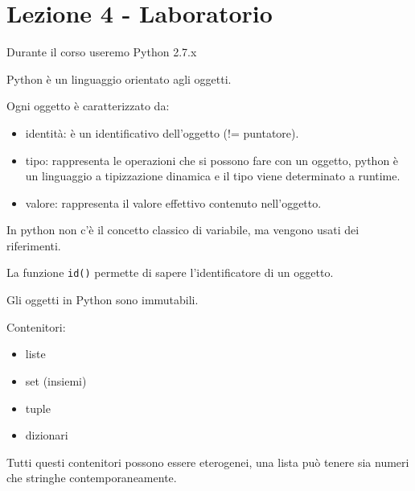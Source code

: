 \section{Lezione 4 - Laboratorio}\label{lezione-4---laboratorio}

Durante il corso useremo Python 2.7.x

Python è un linguaggio orientato agli oggetti.

Ogni oggetto è caratterizzato da:

\begin{itemize}
\tightlist
\item
  identità: è un identificativo dell'oggetto (!= puntatore).
\item
  tipo: rappresenta le operazioni che si possono fare con un oggetto,
  python è un linguaggio a tipizzazione dinamica e il tipo viene
  determinato a runtime.
\item
  valore: rappresenta il valore effettivo contenuto nell'oggetto.
\end{itemize}

In python non c'è il concetto classico di variabile, ma vengono usati
dei riferimenti.


La funzione \texttt{id()} permette di sapere l'identificatore di un
oggetto.

Gli oggetti in Python sono immutabili.

Contenitori:

\begin{itemize}
\tightlist
\item
  liste
\item
  set (insiemi)
\item
  tuple
\item
  dizionari
\end{itemize}

Tutti questi contenitori possono essere eterogenei, una lista può tenere
sia numeri che stringhe contemporaneamente.

